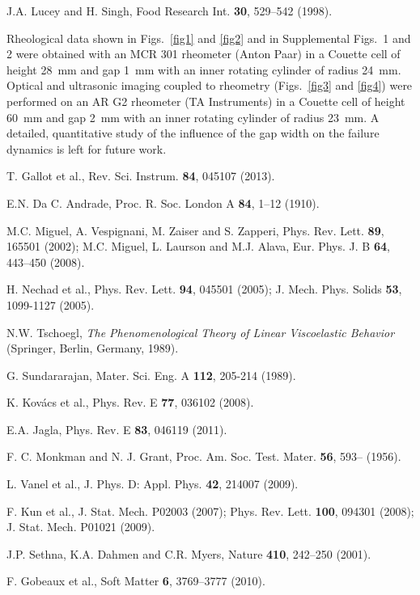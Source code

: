 \documentclass[twocolumn,superscriptaddress,showpacs,preprintnumbers,amsmath,amssymb,prl]{revtex4}
\begin{document}
\begin{thebibliography}{}
 J.A. Lucey and H. Singh, Food Research Int. {\bf 30}, 529--542 (1998).

 Rheological data shown in Figs.~\ref{fig1} and \ref{fig2} and in Supplemental Figs.~1 and 2 were obtained with an MCR 301 rheometer (Anton Paar) in a Couette cell of height 28~mm and gap 1~mm with an inner rotating cylinder of radius 24~mm. Optical and ultrasonic imaging coupled to rheometry (Figs.~\ref{fig3} and \ref{fig4}) were performed on an AR G2 rheometer (TA Instruments) in a Couette cell of height 60~mm and gap 2~mm with an inner rotating cylinder of radius 23~mm. A detailed, quantitative study of the influence of the gap width on the failure dynamics is left for future work.

 T. Gallot et al., Rev. Sci. Instrum. {\bf 84}, 045107 (2013).

 E.N. Da C. Andrade, Proc. R. Soc. London A {\bf 84}, 1--12 (1910).

 M.C. Miguel, A. Vespignani, M. Zaiser and S. Zapperi, Phys. Rev. Lett. {\bf 89}, 165501 (2002); M.C. Miguel, L. Laurson and M.J. Alava, Eur. Phys. J. B {\bf 64}, 443--450 (2008).

 H. Nechad et al., Phys. Rev. Lett. {\bf 94}, 045501 (2005); J. Mech. Phys. Solids {\bf 53}, 1099-1127 (2005).

  N.W. Tschoegl, {\it The Phenomenological Theory of Linear Viscoelastic Behavior} (Springer, Berlin, Germany, 1989).

 G. Sundararajan, Mater. Sci. Eng. A {\bf 112}, 205-214 (1989).

 K. Kov\'acs et al., Phys. Rev. E \textbf{77}, 036102 (2008).

 E.A. Jagla, Phys. Rev. E {\bf 83}, 046119 (2011).

 F. C. Monkman and N. J. Grant, Proc. Am. Soc. Test.
Mater. {\bf 56}, 593-- (1956).

 L. Vanel et al., J. Phys. D: Appl. Phys. {\bf 42}, 214007 (2009).

 F. Kun et al., J. Stat. Mech. P02003 (2007); Phys. Rev. Lett. {\bf 100}, 094301 (2008); J. Stat. Mech. P01021 (2009).

 J.P. Sethna, K.A. Dahmen and C.R. Myers, Nature {\bf 410}, 242--250 (2001).

 F. Gobeaux et al., Soft Matter {\bf 6}, 3769--3777 (2010).


\end{thebibliography}
\end{document}
